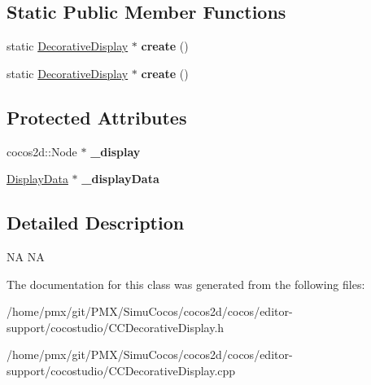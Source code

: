 \subsection*{Static Public Member Functions}
\begin{DoxyCompactItemize}
\item 
\mbox{\label{classcocostudio_1_1DecorativeDisplay_acd77164fc483d426ea9a88f434745149}} 
static \hyperlink{classcocostudio_1_1DecorativeDisplay}{Decorative\+Display} $\ast$ {\bfseries create} ()
\item 
\mbox{\label{classcocostudio_1_1DecorativeDisplay_ab4979050dff4c787260dc68cd20842b7}} 
static \hyperlink{classcocostudio_1_1DecorativeDisplay}{Decorative\+Display} $\ast$ {\bfseries create} ()
\end{DoxyCompactItemize}
\subsection*{Protected Attributes}
\begin{DoxyCompactItemize}
\item 
\mbox{\label{classcocostudio_1_1DecorativeDisplay_a28da5f6d11ade1b6ec43eff113786fea}} 
cocos2d\+::\+Node $\ast$ {\bfseries \+\_\+display}
\item 
\mbox{\label{classcocostudio_1_1DecorativeDisplay_a29fb7ea99cb84e7f6d7d7f97f94b3718}} 
\hyperlink{classcocostudio_1_1DisplayData}{Display\+Data} $\ast$ {\bfseries \+\_\+display\+Data}
\end{DoxyCompactItemize}


\subsection{Detailed Description}
NA  NA 

The documentation for this class was generated from the following files\+:\begin{DoxyCompactItemize}
\item 
/home/pmx/git/\+P\+M\+X/\+Simu\+Cocos/cocos2d/cocos/editor-\/support/cocostudio/C\+C\+Decorative\+Display.\+h\item 
/home/pmx/git/\+P\+M\+X/\+Simu\+Cocos/cocos2d/cocos/editor-\/support/cocostudio/C\+C\+Decorative\+Display.\+cpp\end{DoxyCompactItemize}

